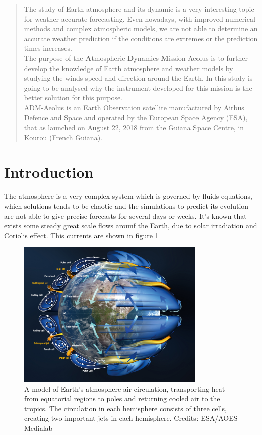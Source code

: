 \begin{abstract}
The study of Earth atmosphere and its dynamic is a very interesting topic for
weather accurate forecasting. Even nowadays, with improved numerical methods
and complex atmospheric models, we are not able to determine an accurate weather
prediction if the conditions are extremes or the prediction times increases.\\

The purpose of the \textbf{A}tmospheric \textbf{D}ynamics \textbf{M}ission Aeolus
is to further develop the knowledge of Earth atmosphere and weather models by
studying the winds speed and direction around the Earth.
In this study is going to be analysed why the instrument developed for this
mission is the better solution for this purpose.\\

ADM-Aeolus is an Earth Observation satellite manufactured by Airbus Defence and Space
and operated by the European Space Agency (ESA), that as launched on August 22, 2018
from the Guiana Space Centre, in Kourou (French Guiana).\\
\end{abstract}

\section{Introduction}

The atmosphere is a very complex system which is governed by fluids equations,
which solutions tends to be chaotic and the simulations to predict its evolution
are not able to give precise forecasts for several days or weeks. It's known
that exists some steady great scale flows arounf the Earth, due to solar irradiation
and Coriolis effect. This currents are shown in figure \ref{fig:earth_winds}\\

\begin{figure}[h]
	\centering
	\includegraphics[width=0.8\textwidth]{img/Earth_winds.jpg}
	\caption[Earth winds circulation]{A model of Earth's atmosphere air circulation, transporting heat
	from equatorial regions to poles and returning cooled air to the tropics.
	The circulation in each hemisphere consists of three cells, creating two
	important jets in each hemisphere. Credits: ESA/AOES Medialab \cite{earth_winds}}
	\label{fig:earth_winds}
\end{figure}



